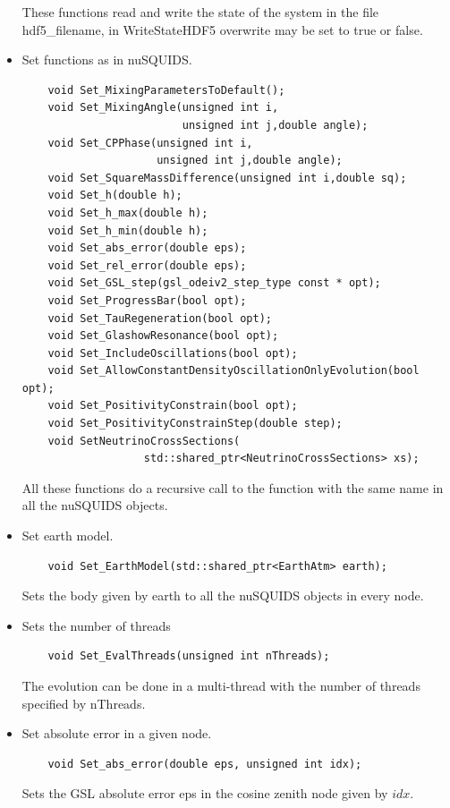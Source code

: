 \documentclass[3p,12pt]{elsarticle}
\newcommand{\ttf}{\ttfamily}
\begin{document}
\begin{itemize}
  These functions read and write the state of the system in the file
  {\ttf hdf5\_filename}, in {\ttf WriteStateHDF5} {\ttf overwrite} may be set to
  {\ttf true} or {\ttf false}.

\item Set functions as in nuSQUIDS.
  \begin{lstlisting}
    void Set_MixingParametersToDefault();
    void Set_MixingAngle(unsigned int i,
                         unsigned int j,double angle);
    void Set_CPPhase(unsigned int i,
                     unsigned int j,double angle);
    void Set_SquareMassDifference(unsigned int i,double sq);
    void Set_h(double h);
    void Set_h_max(double h);
    void Set_h_min(double h);
    void Set_abs_error(double eps);
    void Set_rel_error(double eps);
    void Set_GSL_step(gsl_odeiv2_step_type const * opt);
    void Set_ProgressBar(bool opt);
    void Set_TauRegeneration(bool opt);
    void Set_GlashowResonance(bool opt);
    void Set_IncludeOscillations(bool opt);
    void Set_AllowConstantDensityOscillationOnlyEvolution(bool opt);
    void Set_PositivityConstrain(bool opt);
    void Set_PositivityConstrainStep(double step);
    void SetNeutrinoCrossSections(
                   std::shared_ptr<NeutrinoCrossSections> xs);
  \end{lstlisting}
  All these functions do a recursive call to the function with
  the same name in all the nuSQUIDS objects.
  

\item Set earth model.
  \begin{lstlisting}
    void Set_EarthModel(std::shared_ptr<EarthAtm> earth);
  \end{lstlisting}
  Sets the body given by {\ttf earth} to all the nuSQUIDS objects in
  every node.

\item Sets the number of threads
  \begin{lstlisting}
    void Set_EvalThreads(unsigned int nThreads);
  \end{lstlisting}
  The evolution can be done in a multi-thread with the number of
  threads specified by {\ttf nThreads}.

\item Set absolute error in a given node.
  \begin{lstlisting}
    void Set_abs_error(double eps, unsigned int idx);
  \end{lstlisting}
  Sets the GSL absolute error {\ttf eps} in the cosine zenith node
  given by $idx$.


\end{itemize}
\end{document}
